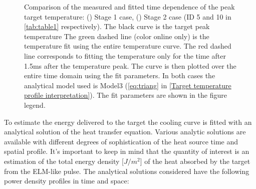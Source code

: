 \begin{figure}[!ht]
\begin{subfigure}{0.45\linewidth}
         \vspace{-20mm}
         \caption{\phantom{wewwwwwwwwwww}}
         \label{fig:IR1b}
     \end{subfigure}
        \caption{Comparison of the measured and fitted time dependence of the peak target temperature: () Stage 1 case, () Stage 2 case (ID 5 and 10 in \autoref{tab:table1} respectively). The black curve is the target peak temperature The green dashed line (color online only) is the temperature fit using the entire temperature curve. The red dashed line corresponds to fitting the temperature only for the time after 1.5ms after the temperature peak. The curve is then plotted over the entire time domain using the fit parameters. In both cases the analytical model used is Model3 (\autoref{eq:triang} in \autoref{Target temperature profile interpretation}). The fit parameters are shown in the figure legend.}
        \label{fig:IR1}
\end{figure}

To estimate the energy delivered to the target the cooling curve is fitted with an analytical solution of the heat transfer equation. Various analytic solutions are available with different degrees of sophistication of the heat source time and spatial profile. It’s important to keep in mind that the quantity of interest is an estimation of the total energy density [$J/m^2$] of the heat absorbed by the target from the ELM-like pulse. The analytical solutions considered have the following power density profiles in time and space:

